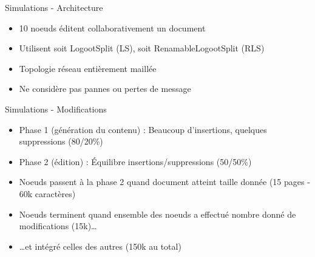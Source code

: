 \begin{frame}{Simulations - Architecture}
\begin{figure}
{
    }
  \end{figure}
  \begin{itemize}
    \item 10 noeuds éditent collaborativement un document
    \item Utilisent soit LogootSplit (LS), soit RenamableLogootSplit (RLS)
  \end{itemize}
  \pause
  \begin{itemize}
    \item Topologie réseau entièrement maillée
    \item Ne considère pas pannes ou pertes de message
   \end{itemize}
\end{frame}

\begin{frame}{Simulations - Modifications}
  \begin{itemize}
    \item Phase 1 (génération du contenu) : Beaucoup d'insertions, quelques suppressions (80/20\%)
    \item Phase 2 (édition) : Équilibre insertions/suppressions (50/50\%)
    \item Noeuds passent à la phase 2 quand document atteint taille donnée (15 pages - 60k caractères)
  \end{itemize}
  \pause
  \begin{itemize}
    \item Noeuds terminent quand ensemble des noeuds a effectué nombre donné de modifications (15k)\dots
    \item \dots et intégré celles des autres (150k au total)
  \end{itemize}
\end{frame}

